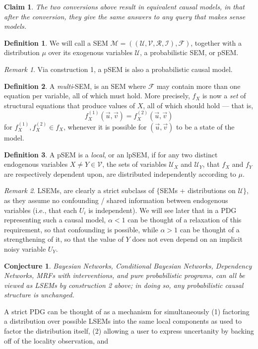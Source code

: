 \documentclass{article}
\theoremstyle{plain}
\newtheorem{claim}[theorem]{Claim}
\newtheorem{conj}[theorem]{Conjecture}
\theoremstyle{definition}
\newtheorem{defn}{Definition}
\theoremstyle{remark}
\newtheorem*{remark}{Remark}
\begin{document}
\begin{claim}
	The two conversions above result in equivalent causal models, in that after the conversion, they give the same answers to any query that makes sense models.
\end{claim}


\begin{defn}
	We will call a SEM $\mathcal M = ((\mathcal U, \mathcal V, \mathcal R, \mathcal I), \mathcal F)$, together with a 	distribution $\mu$ over its exogenous variables $\mathcal U$, a probabilistic SEM, or pSEM.
\end{defn}
\begin{remark}
Via construction 1, a pSEM is also a probabilistic causal model.
\end{remark}
\begin{defn}
	A \emph{multi}-SEM, is an SEM where $\mathcal F$ may contain more than one equation per variable, all of which must hold. More precisely, $f_X$ is now a \emph{set} of structural equations that produce values of $X$, all of which should hold --- that is, 
	\[ f_X^{(1)} (\vec u, \vec v) = f_X^{(2)}(\vec u, \vec v) \]
	for $f_X^{(1)}, f_X^{(2)} \in f_X$, whenever it is possible for $(\vec u, \vec v)$ to be a state of the model.
\end{defn}

\begin{defn}
	 A pSEM is a \emph{local}, or an lpSEM, if for any two distinct endogenous variables $X \neq Y \in \mathcal V$, the sets of variables $\mathcal U_X$ and $\mathcal U_Y$, that $f_X$ and $f_Y$ are respectively dependent upon, are distributed independently according to $\mu$.
\end{defn}

\begin{remark}
	LSEMs, are clearly a strict subclass of $\{$SEMs + distributions on $\mathcal U\}$, as they assume no confounding / shared information between endogenous variables (i.e., that each $U_i$ is independent). 
	We will see later that in a PDG representing such a causal model, $\alpha < 1$ can be thought of a relaxation of this requirement, so that confounding is possible, while $\alpha > 1$ can be thought of a strengthening of it, so that the value of $Y$ does not even depend on an implicit noisy variable $U_Y$.
\end{remark}

\begin{conj}
	Bayesian Networks, Conditional Bayesian Networks, Dependency Networks, MRFs with interventions, and pure probabilistic programs, can all be viewed as LSEMs by construction 2 above; in doing so, any probabilistic causal structure is unchanged.
\end{conj}
A strict PDG can be thought of as a mechanism for simultaneously (1) factoring a distribution over possible LSEMs into the same local components as used to factor the distribution itself, (2) allowing a user to express uncertanity by backing off of the locality observation, and 
\end{document}
